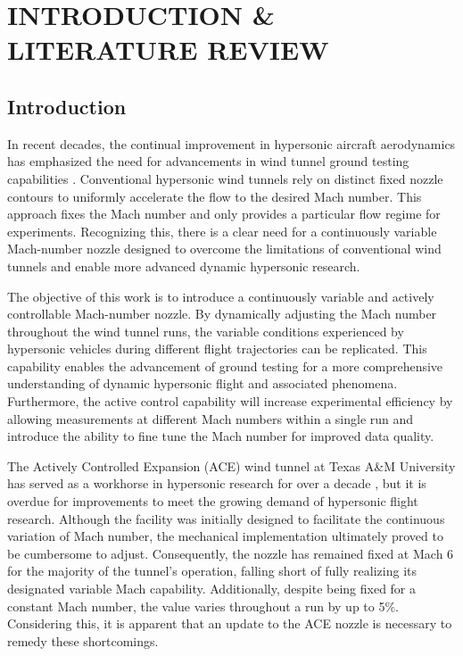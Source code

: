 %
%  
%



\pagestyle{plain} %
\setcounter{page}{1}


\chapter{INTRODUCTION \& LITERATURE REVIEW}

\section{Introduction}

In recent decades, the continual improvement in hypersonic aircraft aerodynamics has emphasized the need for advancements in wind tunnel ground testing capabilities \cite{leyva}. Conventional hypersonic wind tunnels rely on distinct fixed nozzle contours to uniformly accelerate the flow to the desired Mach number. This approach fixes the Mach number and only provides a particular flow regime for experiments. Recognizing this, there is a clear need for a continuously variable Mach-number nozzle designed to overcome the limitations of conventional wind tunnels and enable more advanced dynamic hypersonic research.

The objective of this work is to introduce a continuously variable and actively controllable Mach-number nozzle. By dynamically adjusting the Mach number throughout the wind tunnel runs, the variable conditions experienced by hypersonic vehicles during different flight trajectories can be replicated. This capability enables the advancement of ground testing for a more comprehensive understanding of dynamic hypersonic flight and associated phenomena. Furthermore, the active control capability will increase experimental efficiency by allowing measurements at different Mach numbers within a single run and introduce the ability to fine tune the Mach number for improved data quality.

The Actively Controlled Expansion (ACE) wind tunnel at Texas A\&M University has served as a workhorse in hypersonic research for over a decade \cite{ace09,ace10-calibrate,tichenor-dis,mai-dis,neel-dis,leidy-dis}, but it is overdue for improvements to meet the growing demand of hypersonic flight research. Although the facility was initially designed to facilitate the continuous variation of Mach number, the mechanical implementation ultimately proved to be cumbersome to adjust. Consequently, the nozzle has remained fixed at Mach 6 for the majority of the tunnel's operation, falling short of fully realizing its designated variable Mach capability. Additionally, despite being fixed for a constant Mach number, the value varies throughout a run by up to 5\%. Considering this, it is apparent that an update to the ACE nozzle is necessary to remedy these shortcomings.


